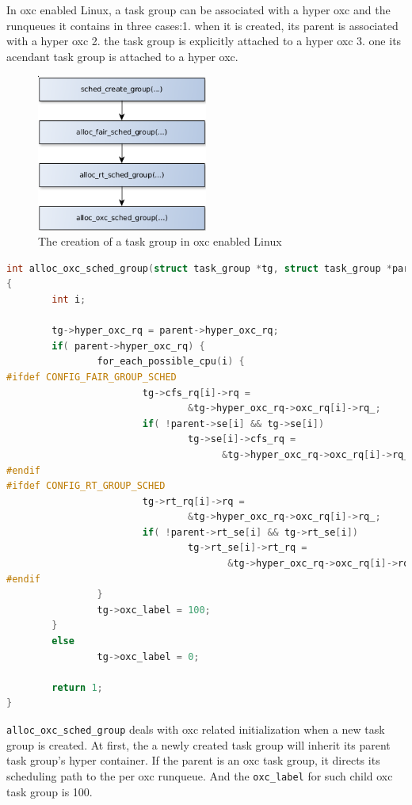 In oxc enabled Linux, a task group can be associated with a hyper oxc and
the runqueues it contains in three cases:1. when it is created, its parent is 
associated with a hyper oxc 2. the task group is explicitly attached to
a hyper oxc 3. one its acendant task group is attached to a hyper oxc.
\begin{figure}[htbp]
        \centering
        \includegraphics[height=0.25\textheight,width=0.5\textwidth]{images/tg_creation_oxc}
        \caption{The creation of a task group in oxc enabled Linux}
        \label{fig:tg_creation_oxc}
\end{figure}

\begin{lstlisting}[language=C,
        caption={OXC scheduling related initilization 
					during task group creation}]
int alloc_oxc_sched_group(struct task_group *tg, struct task_group *parent)
{
        int i;

        tg->hyper_oxc_rq = parent->hyper_oxc_rq;
        if( parent->hyper_oxc_rq) {
                for_each_possible_cpu(i) {
#ifdef CONFIG_FAIR_GROUP_SCHED
                        tg->cfs_rq[i]->rq =
                                &tg->hyper_oxc_rq->oxc_rq[i]->rq_;
                        if( !parent->se[i] && tg->se[i])
                                tg->se[i]->cfs_rq =
                                      &tg->hyper_oxc_rq->oxc_rq[i]->rq_.cfs;
#endif
#ifdef CONFIG_RT_GROUP_SCHED
                        tg->rt_rq[i]->rq =
                                &tg->hyper_oxc_rq->oxc_rq[i]->rq_;
                        if( !parent->rt_se[i] && tg->rt_se[i])
                                tg->rt_se[i]->rt_rq =
                                       &tg->hyper_oxc_rq->oxc_rq[i]->rq_.rt;
#endif
                }
                tg->oxc_label = 100;
        }
        else
                tg->oxc_label = 0;

        return 1;
}
\end{lstlisting}
\texttt{alloc\_oxc\_sched\_group} deals with oxc related initialization when a 
new task group is created. At first, the a newly created task group will inherit
its parent task group's hyper container. If the parent is an oxc task group, it
directs its scheduling path to the per oxc runqueue. And the \texttt{oxc\_label}
for such child oxc task group is 100.

